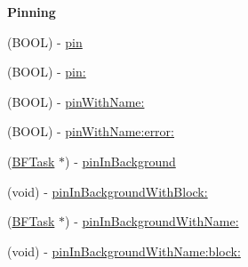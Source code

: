 \begin{Indent}{\bf Pinning}\par
{\em 

 

 }\begin{DoxyCompactItemize}
\item 
(B\+O\+O\+L) -\/ \hyperlink{interface_p_f_object_a48f9b1b0cfb0ae73050288f6e80df138}{pin}
\item 
(B\+O\+O\+L) -\/ \hyperlink{interface_p_f_object_a8a625ba1a4e971b9a1baae2751afc4d1}{pin\+:}
\item 
(B\+O\+O\+L) -\/ \hyperlink{interface_p_f_object_a5d42f3a47a2b12c45ace4fd0ae1cfed2}{pin\+With\+Name\+:}
\item 
(B\+O\+O\+L) -\/ \hyperlink{interface_p_f_object_a981f300fc73989e22b9830f6ca1ad3dc}{pin\+With\+Name\+:error\+:}
\item 
(\hyperlink{interface_b_f_task}{B\+F\+Task} $\ast$) -\/ \hyperlink{interface_p_f_object_acf8e9063b2f2902205d6543d89cfbfb4}{pin\+In\+Background}
\item 
(void) -\/ \hyperlink{interface_p_f_object_a35ad8691e4d82e8b917195b1ee06625c}{pin\+In\+Background\+With\+Block\+:}
\item 
(\hyperlink{interface_b_f_task}{B\+F\+Task} $\ast$) -\/ \hyperlink{interface_p_f_object_a68c437692e5c24e02b018b4f11b5916b}{pin\+In\+Background\+With\+Name\+:}
\item 
(void) -\/ \hyperlink{interface_p_f_object_abfbc0604772dc55089c404914ffee532}{pin\+In\+Background\+With\+Name\+:block\+:}
\end{DoxyCompactItemize}
\end{Indent}
